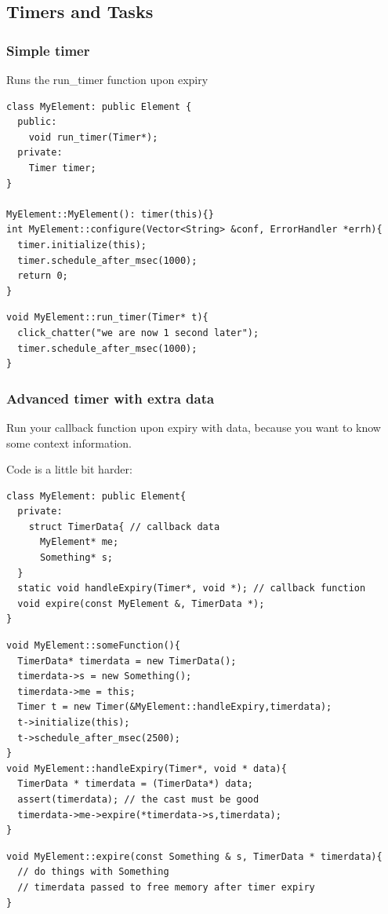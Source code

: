 \documentclass{beamer}
\begin{document}
\subsection{Timers and Tasks} %
\label{sub:timers_and_tasks}

\begin{frame}
\frametitle{Simple timer}
Runs the run\_timer function upon expiry
\begin{lstlisting}[basicstyle=\footnotesize]
class MyElement: public Element {
  public:
    void run_timer(Timer*);
  private:
    Timer timer;
}

MyElement::MyElement(): timer(this){}
int MyElement::configure(Vector<String> &conf, ErrorHandler *errh){
  timer.initialize(this);
  timer.schedule_after_msec(1000);
  return 0;
}
\end{lstlisting}
\begin{lstlisting}[basicstyle=\footnotesize]
void MyElement::run_timer(Timer* t){
  click_chatter("we are now 1 second later");
  timer.schedule_after_msec(1000);
}
\end{lstlisting}
\end{frame}

\begin{frame}
\frametitle{Advanced timer with extra data}
Run your callback function upon expiry with data, because you want to know some context information.

Code is a little bit harder:
\begin{lstlisting}[basicstyle=\footnotesize]
class MyElement: public Element{
  private:
    struct TimerData{ // callback data
      MyElement* me;
      Something* s;
  }
  static void handleExpiry(Timer*, void *); // callback function
  void expire(const MyElement &, TimerData *);
}
\end{lstlisting}
\begin{lstlisting}[basicstyle=\footnotesize]
void MyElement::someFunction(){
  TimerData* timerdata = new TimerData();
  timerdata->s = new Something();
  timerdata->me = this;
  Timer t = new Timer(&MyElement::handleExpiry,timerdata);
  t->initialize(this);
  t->schedule_after_msec(2500);
}
void MyElement::handleExpiry(Timer*, void * data){
  TimerData * timerdata = (TimerData*) data;
  assert(timerdata); // the cast must be good
  timerdata->me->expire(*timerdata->s,timerdata);
}
\end{lstlisting}
\begin{lstlisting}[basicstyle=\footnotesize]
void MyElement::expire(const Something & s, TimerData * timerdata){
  // do things with Something
  // timerdata passed to free memory after timer expiry
}
\end{lstlisting}
\end{frame}
\end{document}
